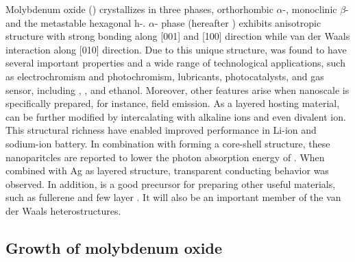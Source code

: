 Molybdenum oxide () crystallizes in three phases, orthorhombic $\alpha$-, monoclinic $\beta$- and the metastable hexagonal h-.\citep{Deb1968,Fibers2007} $\alpha$- phase (hereafter ) exhibits anisotropic structure with strong bonding along [001] and [100] direction while van der Waals interaction along [010] direction.\cite{He2003} Due to this unique structure,  was found to have several important properties and a wide range of technological applications, such as electrochromism and photochromism,\cite{Yao1992} lubricants,\cite{Sheehan1996} photocatalysts,\cite{Chen2010} and gas sensor, including ,\cite{Comini2005} ,\cite{Taurino2006} \cite{Sha2009} and ethanol.\cite{Choopun} Moreover, other features arise when nanoscale  is specifically prepared, for instance, field emission.\citep{Li2002d,Zhou2003b}  As a layered hosting material,  can be further modified by intercalating with alkaline ions\citep{Spahr1995,Li2006b,Hu2011} and even divalent ion.\cite{Sian2005} This structural richness have enabled improved performance in Li-ion\cite{Mai2007} and sodium-ion battery.\cite{Hariharan2013} In combination with  forming a core-shell structure, these nanoparitcles are reported to lower the photon absorption energy of .\cite{Elder2000} When combined with Ag as layered structure, transparent conducting behavior was observed.\cite{Nguyen2012} In addition,  is a good precursor for preparing other useful materials, such as  fullerene\cite{Li2003c} and few layer .\cite{Lin2012} It will also be an important member of the van der Waals heterostructures.\cite{Geim2013}


\subsection{Growth of molybdenum oxide}

